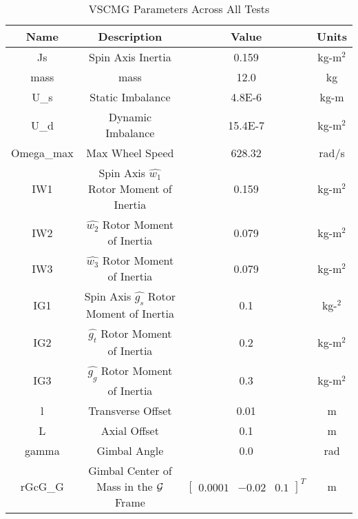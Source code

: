 \begin{table}[htbp]
	\caption{VSCMG Parameters Across All Tests}
	\label{tab:rw15}
	\centering \fontsize{10}{10}\selectfont
	\begin{tabular}{ c | c | c | c } %
		\hline
		\textbf{Name}  & \textbf{Description}  & \textbf{Value} & \textbf{Units} \\
		\hline
		Js  & Spin Axis Inertia & 0.159 & kg-m$^2$ \\
		mass & mass & 12.0 & kg \\
		U\_s & Static Imbalance & 4.8E-6 & kg-m \\
		U\_d & Dynamic Imbalance & 15.4E-7 & kg-m$^2$ \\
		Omega\_max & Max Wheel Speed & 628.32 & rad/s \\
		IW1 & Spin Axis $\hat{w_1}$ Rotor Moment of Inertia & 0.159  & kg-m$^2$ \\
		IW2 &  $\hat{w_2}$ Rotor Moment of Inertia & 0.079 & kg-m$^2$ \\
		IW3 & $\hat{w_3}$ Rotor Moment of Inertia & 0.079 & kg-m$^2$ \\
		IG1 & Spin Axis $\hat{g_s}$ Rotor Moment of Inertia & 0.1 & kg-$^2$ \\
		IG2 & $\hat{g_t}$ Rotor Moment of Inertia & 0.2 & kg-m$^2$ \\
		IG3 & $\hat{g_g}$ Rotor Moment of Inertia & 0.3 & kg-m$^2$ \\
		l  & Transverse Offset & 0.01 & m \\
		L & Axial Offset & 0.1 & m \\
		gamma & Gimbal Angle & 0.0  & rad \\
		rGcG\_G & Gimbal Center of Mass in the $\cal{G}$ Frame & $\begin{bmatrix}
		0.0001 & -0.02 & 0.1 \end{bmatrix}^T$ & m \\
		
	\end{tabular}
\end{table}

